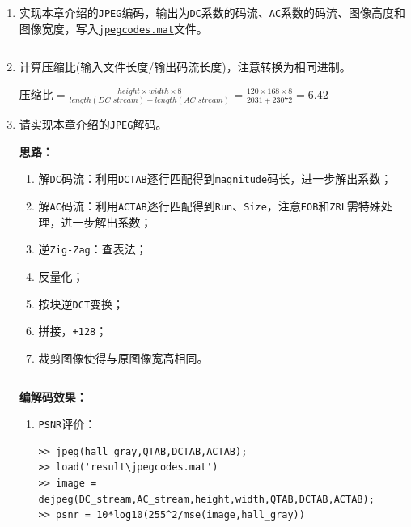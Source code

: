 \documentclass{article}
\numberwithin{figure}{section}
\numberwithin{table}{section}
\numberwithin{listing}{section}
\numberwithin{equation}{section}
\begin{document}
\begin{enumerate}
            \item 实现本章介绍的\texttt{JPEG}编码，输出为\texttt{DC}系数的码流、\texttt{AC}系数的码流、图像高度和图像宽度，写入\href{run:../result/jpegcodes.mat}{\texttt{jpegcodes.mat}}文件。

                \inputminted{matlab}{../jpeg.m}
                \begingroup
                \endgroup

            \item 计算压缩比(输入文件长度/输出码流长度)，注意转换为相同进制。

                压缩比$=\frac{height\times width\times 8}{length(DC\_stream) + length(AC\_stream)}=\frac{120\times168\times 8}{2031+23072}=6.42$

            \item 请实现本章介绍的\texttt{JPEG}解码。

                \textbf{思路：}

                \begin{enumerate}
                    \item 解\texttt{DC}码流：利用\texttt{DCTAB}逐行匹配得到\texttt{magnitude}码长，进一步解出系数；
                    \item 解\texttt{AC}码流：利用\texttt{ACTAB}逐行匹配得到\texttt{Run}、\texttt{Size}，注意\texttt{EOB}和\texttt{ZRL}需特殊处理，进一步解出系数；
                    \item 逆\texttt{Zig-Zag}：查表法；
                    \item 反量化；
                    \item 按块逆\texttt{DCT}变换；
                    \item 拼接，\texttt{+128}；
                    \item 裁剪图像使得与原图像宽高相同。
                \end{enumerate}

                \inputminted{matlab}{../dejpeg.m}
                \begingroup
                \endgroup

                \textbf{编解码效果：}

                \begin{enumerate}
                    \item \texttt{PSNR}评价：
                        \begin{verbatim}
>> jpeg(hall_gray,QTAB,DCTAB,ACTAB);
>> load('result\jpegcodes.mat')
>> image = dejpeg(DC_stream,AC_stream,height,width,QTAB,DCTAB,ACTAB);
>> psnr = 10*log10(255^2/mse(image,hall_gray))


\end{verbatim}
\end{enumerate}
\end{enumerate}
\end{document}
